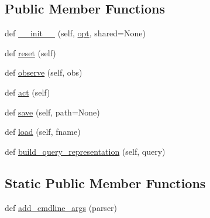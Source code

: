 \subsection*{Public Member Functions}
\begin{DoxyCompactItemize}
\item 
def \hyperlink{classparlai_1_1agents_1_1ir__baseline_1_1ir__baseline_1_1IrBaselineAgent_a7c734ad9e54fd95fc080e9e51f7a7bbc}{\+\_\+\+\_\+init\+\_\+\+\_\+} (self, \hyperlink{classparlai_1_1agents_1_1ir__baseline_1_1ir__baseline_1_1IrBaselineAgent_a2c83d3c7e15884871dbfabea9f110933}{opt}, shared=None)
\item 
def \hyperlink{classparlai_1_1agents_1_1ir__baseline_1_1ir__baseline_1_1IrBaselineAgent_adc3f036e92741d87db95e47dfc5fc0ef}{reset} (self)
\item 
def \hyperlink{classparlai_1_1agents_1_1ir__baseline_1_1ir__baseline_1_1IrBaselineAgent_ad5edc81f811cfdd89c8518619f5ae15a}{observe} (self, obs)
\item 
def \hyperlink{classparlai_1_1agents_1_1ir__baseline_1_1ir__baseline_1_1IrBaselineAgent_af4e39c5613a045434a38d260e6fc03e6}{act} (self)
\item 
def \hyperlink{classparlai_1_1agents_1_1ir__baseline_1_1ir__baseline_1_1IrBaselineAgent_af0deeaf3d545dac60187f95d30b48171}{save} (self, path=None)
\item 
def \hyperlink{classparlai_1_1agents_1_1ir__baseline_1_1ir__baseline_1_1IrBaselineAgent_a3701001e1de9bcc2d110a318799101c1}{load} (self, fname)
\item 
def \hyperlink{classparlai_1_1agents_1_1ir__baseline_1_1ir__baseline_1_1IrBaselineAgent_a87f02e724544fa1531486c1f8f0e2f68}{build\+\_\+query\+\_\+representation} (self, query)
\end{DoxyCompactItemize}
\subsection*{Static Public Member Functions}
\begin{DoxyCompactItemize}
\item 
def \hyperlink{classparlai_1_1agents_1_1ir__baseline_1_1ir__baseline_1_1IrBaselineAgent_aefd4949ff6e98ac3ccb4b7348794080d}{add\+\_\+cmdline\+\_\+args} (parser)
\end{DoxyCompactItemize}
